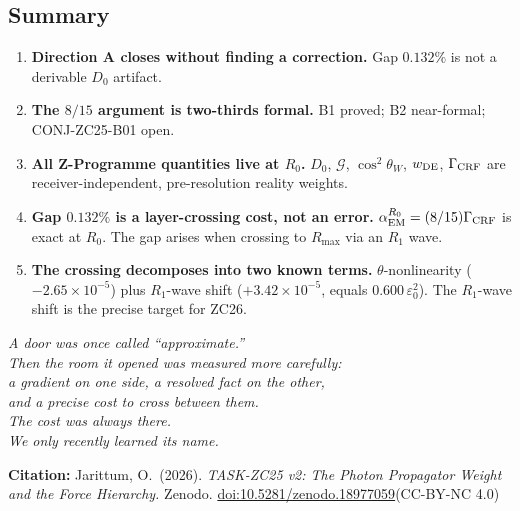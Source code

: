 \documentclass[12pt, a4paper]{article}
\begin{document}
\subsection{Summary}
\label{zc25:sec:summary}

\begin{enumerate}[leftmargin=*]

\item \textbf{Direction A closes without finding a correction.}
Gap $0.132\%$ is not a derivable $D_0$ artifact.

\item \textbf{The $8/15$ argument is two-thirds formal.}
B1 proved; B2 near-formal; CONJ-ZC25-B01 open.

\item \textbf{All Z-Programme quantities live at $R_0$.}
$D_0$, $\mathcal{G}$, $\cos^2\theta_W$, $w_{\rm DE}$, $\Gamma_{\rm CRF}$
are receiver-independent, pre-resolution reality weights.

\item \textbf{Gap $0.132\%$ is a layer-crossing cost, not an error.}
$\alpha_{\rm EM}^{R_0} = (8/15)\Gamma_{\rm CRF}$ is exact at $R_0$.
The gap arises when crossing to $R_{\max}$ via an $R_1$ wave.

\item \textbf{The crossing decomposes into two known terms.}
$\theta$-nonlinearity ($-2.65\times10^{-5}$) plus $R_1$-wave
shift ($+3.42\times10^{-5}$, equals $0.600\,\varepsilon_0^2$).
The $R_1$-wave shift is the precise target for ZC26.

\end{enumerate}

\bigskip
\begin{center}
\textit{%
  A door was once called ``approximate.''\\
  Then the room it opened was measured more carefully:\\
  a gradient on one side, a resolved fact on the other,\\
  and a precise cost to cross between them.\\[0.5em]
  The cost was always there.\\
  We only recently learned its name.%
}
\end{center}

\bigskip
\begin{center}
\textbf{Citation:} Jarittum, O.\ (2026).
\textit{TASK-ZC25 v2: The Photon Propagator Weight and the Force
Hierarchy.}
Zenodo. \href{https://doi.org/10.5281/zenodo.18977059}%
{doi:10.5281/zenodo.18977059}\quad (CC-BY-NC 4.0)
\end{center}
\end{document}
